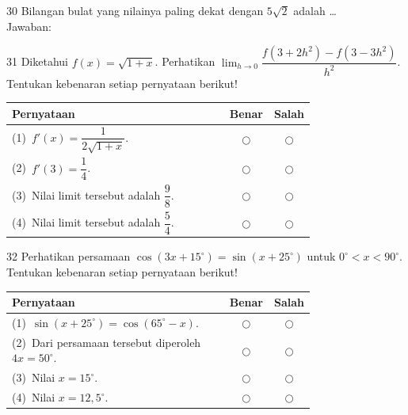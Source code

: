 \documentclass[11pt]{article}
\begin{document}
\begin{soal}{30}
Bilangan bulat yang nilainya paling dekat dengan $5\sqrt{2}$ adalah \ldots\\[0.4em]
Jawaban:\enspace\underline{\hspace{4cm}}
\end{soal}


\begin{soal}{31}
Diketahui $f(x)=\sqrt{1+x}$. Perhatikan
$\displaystyle\lim_{h\to0}\dfrac{f(3+2h^2)-f(3-3h^2)}{h^2}$.
Tentukan kebenaran setiap pernyataan berikut!

\par\smallskip
{\renewcommand{\arraystretch}{1.4}%
\begin{tabular}{@{}p{0.76\linewidth}cc@{}}
\hline
\textbf{Pernyataan} & \textbf{Benar} & \textbf{Salah}\\
\hline
(1)~$f'(x) = \dfrac{1}{2\sqrt{1+x}}$.
  & $\bigcirc$ & $\bigcirc$\\
(2)~$f'(3) = \dfrac{1}{4}$.
  & $\bigcirc$ & $\bigcirc$\\
(3)~Nilai limit tersebut adalah $\dfrac{9}{8}$.
  & $\bigcirc$ & $\bigcirc$\\
(4)~Nilai limit tersebut adalah $\dfrac{5}{4}$.
  & $\bigcirc$ & $\bigcirc$\\
\hline
\end{tabular}}
\end{soal}

\begin{soal}{32}
Perhatikan persamaan $\cos(3x+15^\circ)=\sin(x+25^\circ)$
untuk $0^\circ<x<90^\circ$.
Tentukan kebenaran setiap pernyataan berikut!

\par\smallskip
{\renewcommand{\arraystretch}{1.4}%
\begin{tabular}{@{}p{0.76\linewidth}cc@{}}
\hline
\textbf{Pernyataan} & \textbf{Benar} & \textbf{Salah}\\
\hline
(1)~$\sin(x+25^\circ) = \cos(65^\circ-x)$.
  & $\bigcirc$ & $\bigcirc$\\
(2)~Dari persamaan tersebut diperoleh $4x = 50^\circ$.
  & $\bigcirc$ & $\bigcirc$\\
(3)~Nilai $x = 15^\circ$.
  & $\bigcirc$ & $\bigcirc$\\
(4)~Nilai $x = 12{,}5^\circ$.
  & $\bigcirc$ & $\bigcirc$\\
\hline
\end{tabular}}
\end{soal}
\end{document}
